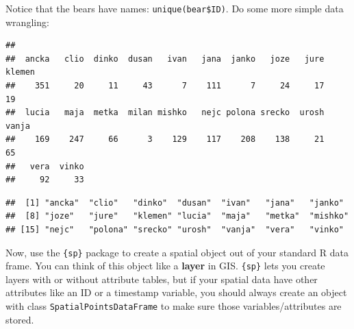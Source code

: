 \documentclass[]{book}
\newenvironment{Shaded}{\begin{snugshade}}{\end{snugshade}}
\newcommand{\KeywordTok}[1]{\textcolor[rgb]{0.13,0.29,0.53}{\textbf{#1}}}
\newcommand{\DecValTok}[1]{\textcolor[rgb]{0.00,0.00,0.81}{#1}}
\newcommand{\StringTok}[1]{\textcolor[rgb]{0.31,0.60,0.02}{#1}}
\newcommand{\CommentTok}[1]{\textcolor[rgb]{0.56,0.35,0.01}{\textit{#1}}}
\newcommand{\OperatorTok}[1]{\textcolor[rgb]{0.81,0.36,0.00}{\textbf{#1}}}
\newcommand{\NormalTok}[1]{#1}
\theoremstyle{definition}
\theoremstyle{definition}
\theoremstyle{definition}
\theoremstyle{remark}
\begin{document}
Notice that the bears have names: \texttt{unique(bear\$ID)}. Do some
more simple data wrangling:

\begin{Shaded}
\end{Shaded}

\begin{verbatim}
## 
##  ancka   clio  dinko  dusan   ivan   jana  janko   joze   jure klemen 
##    351     20     11     43      7    111      7     24     17     19 
##  lucia   maja  metka  milan mishko   nejc polona srecko  urosh  vanja 
##    169    247     66      3    129    117    208    138     21     65 
##   vera  vinko 
##     92     33
\end{verbatim}

\begin{Shaded}
\end{Shaded}

\begin{verbatim}
##  [1] "ancka"  "clio"   "dinko"  "dusan"  "ivan"   "jana"   "janko" 
##  [8] "joze"   "jure"   "klemen" "lucia"  "maja"   "metka"  "mishko"
## [15] "nejc"   "polona" "srecko" "urosh"  "vanja"  "vera"   "vinko"
\end{verbatim}

Now, use the \texttt{\{sp\}} package \citep{R-sp} to create a spatial
object out of your standard R data frame. You can think of this object
like a \textbf{layer} in GIS. \texttt{\{sp\}} lets you create layers
with or without attribute tables, but if your spatial data have other
attributes like an ID or a timestamp variable, you should always create
an object with class \texttt{SpatialPointsDataFrame} to make sure those
variables/attributes are stored.
\end{document}
